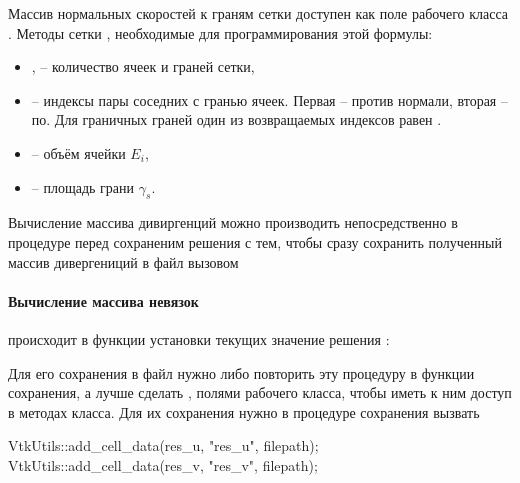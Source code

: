 Массив нормальных скоростей к граням сетки доступен как поле рабочего класса .
Методы сетки , необходимые для программирования этой формулы:
\begin{itemize}
\item {},  -- количество ячеек и граней сетки,
\item {} -- индексы пары соседних с гранью ячеек. Первая -- против нормали, вторая -- по.
Для граничных граней один из возвращаемых индексов равен .
\item {} -- объём ячейки $E_i$,
\item {} -- площадь грани $\gamma_s$.
\end{itemize}
Вычисление массива дивиргенций можно производить
непосредственно в процедуре перед сохраненим
решения
 с тем, чтобы
сразу сохранить полученный массив дивергениций в файл вызовом


\paragraph{Вычисление массива невязок}
происходит в функции установки текущих значение решения :

Для его сохранения в файл нужно либо повторить эту процедуру в функции сохранения,
а лучше сделать ,  полями рабочего класса,
чтобы иметь к ним доступ в методах класса.
Для их сохранения нужно в процедуре сохранения 
вызвать
\begin{cppcode}
VtkUtils::add_cell_data(res_u, "res_u", filepath);
VtkUtils::add_cell_data(res_v, "res_v", filepath);
\end{cppcode}
